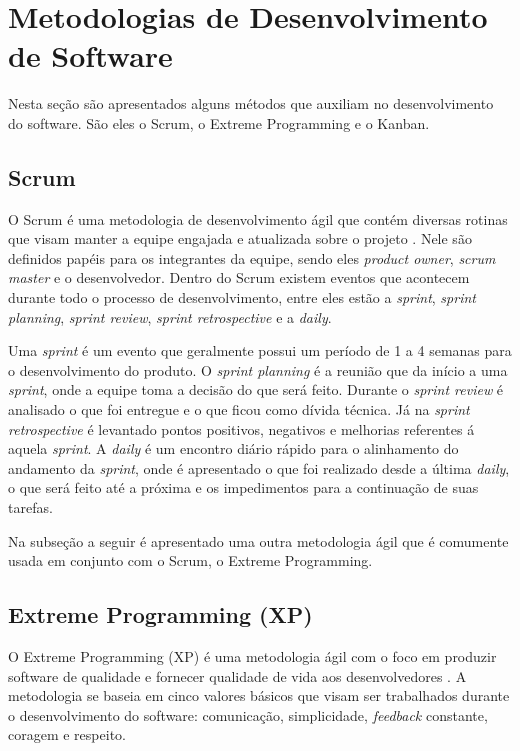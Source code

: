 {\color{textadded}
\section{Metodologias de Desenvolvimento de Software}
\label{sec:mds}

Nesta seção são apresentados alguns métodos que auxiliam no desenvolvimento do software. São eles o Scrum, o Extreme Programming e o Kanban.

\subsection{Scrum}

O Scrum é uma metodologia de desenvolvimento ágil que contém diversas rotinas que visam manter a equipe engajada e atualizada sobre o projeto \cite{schwaber2002agile}. Nele são definidos papéis para os integrantes da equipe, sendo eles \textit{product owner}, \textit{scrum master} e o desenvolvedor. Dentro do Scrum existem eventos que acontecem durante todo o processo de desenvolvimento, entre eles estão a \textit{sprint}, \textit{sprint planning}, \textit{sprint review}, \textit{sprint retrospective} e a \textit{daily}.

Uma \textit{sprint} é um evento que geralmente possui um período de 1 a 4 semanas para o desenvolvimento do produto. O \textit{sprint planning} é a reunião que da início a uma \textit{sprint}, onde a equipe toma a decisão do que será feito. Durante o \textit{sprint review} é analisado o que foi entregue e o que ficou como dívida técnica. Já na \textit{sprint retrospective} é levantado pontos positivos, negativos e melhorias referentes á aquela \textit{sprint}. A \textit{daily} é um encontro diário rápido para o alinhamento do andamento da \textit{sprint}, onde é apresentado o que foi realizado desde a última \textit{daily}, o que será feito até a próxima e os impedimentos para a continuação de suas tarefas.

Na subseção a seguir é apresentado uma outra metodologia ágil que é comumente usada em conjunto com o Scrum, o Extreme Programming.

\subsection{Extreme Programming (XP)}

O Extreme Programming (XP) é uma metodologia ágil com o foco em produzir software de qualidade e fornecer qualidade de vida aos desenvolvedores \cite{lindstrom2004extreme}. A metodologia se baseia em cinco valores básicos que visam ser trabalhados durante o desenvolvimento do software: comunicação, simplicidade, \textit{feedback} constante, coragem e respeito.

}
